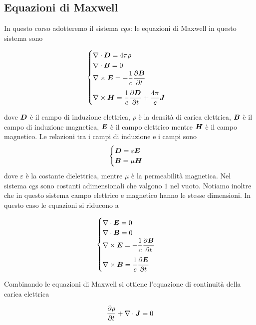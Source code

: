 \subsection{Equazioni di Maxwell}\label{sec:EqMaxwell}
In questo corso adotteremo il sistema $cgs$: le equazioni di Maxwell in questo sistema sono
\begin{EQ}
\begin{equation}
\begin{cases}
\Div{D} = 4\pi\rho \\
\Div{B} = 0 \\
\Rot{E} = -\inv{c}\derP{\V{B}}{t} \\[10pt]
\Rot{H} = \inv{c}\derP{\V{D}}{t} + \dfrac{4\pi}{c} \V{J}
\end{cases} \label{eq:Maxwell1}
\end{equation}
\end{EQ}
dove $\V{D}$ è il campo di induzione elettrica, $\rho$ è la densità di carica elettrica, $\V{B}$ è il campo di induzione magnetica, $\V{E}$ è il campo elettrico mentre $\V{H}$ è il campo magnetico. Le relazioni tra i campi di induzione e i campi sono
\begin{equation}
\begin{cases}
\V{D}= \varepsilon \V{E} \\
\V{B}=\mu \V{H}
\end{cases}
\end{equation}
dove $\varepsilon$ è la costante dielettrica, mentre $\mu$ è la permeabilità magnetica. Nel sistema cgs sono costanti adimensionali che valgono $1$ nel vuoto. Notiamo inoltre che in questo sistema campo elettrico e magnetico hanno le stesse dimensioni. In questo caso le equazioni si riducono a
\begin{EQ}
\begin{equation}
\begin{cases}
\Div{E} = 0 \\
\Div{B} = 0 \\
\Rot{E} = -\inv{c}\derP{\V{B}}{t} \\[10pt]
\Rot{B} = \inv{c}\derP{\V{E}}{t} 
\end{cases} \label{eq:Maxwell2}
\end{equation}
\end{EQ}
 Combinando le equazioni di Maxwell si ottiene l'equazione di continuità della carica elettrica
\begin{EQ}
\begin{equation}
\derP{\rho}{t} + \Div{J} =0
\end{equation}
\end{EQ}
